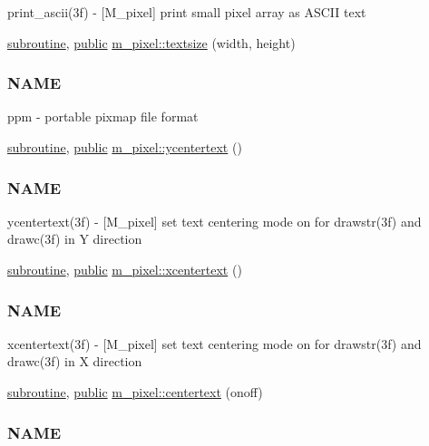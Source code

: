 \begin{DoxyCompactItemize}
\begin{DoxyCompactList}
print\+\_\+ascii(3f) -\/ \mbox{[}M\+\_\+pixel\mbox{]} print small pixel array as A\+S\+C\+II text \end{DoxyCompactList}\item 
\hyperlink{M__stopwatch_83_8txt_acfbcff50169d691ff02d4a123ed70482}{subroutine}, \hyperlink{M__stopwatch_83_8txt_a2f74811300c361e53b430611a7d1769f}{public} \hyperlink{namespacem__pixel_a070e9fff1f2cd0c89d40c5d3c72b7f2c}{m\+\_\+pixel\+::textsize} (width, height)
\begin{DoxyCompactList}\small\item\em \subsubsection*{N\+A\+ME}

ppm -\/ portable pixmap file format \end{DoxyCompactList}\item 
\hyperlink{M__stopwatch_83_8txt_acfbcff50169d691ff02d4a123ed70482}{subroutine}, \hyperlink{M__stopwatch_83_8txt_a2f74811300c361e53b430611a7d1769f}{public} \hyperlink{namespacem__pixel_a2e32105b5e77abf38768fec6b11376a3}{m\+\_\+pixel\+::ycentertext} ()
\begin{DoxyCompactList}\small\item\em \subsubsection*{N\+A\+ME}

ycentertext(3f) -\/ \mbox{[}M\+\_\+pixel\mbox{]} set text centering mode on for drawstr(3f) and drawc(3f) in Y direction \end{DoxyCompactList}\item 
\hyperlink{M__stopwatch_83_8txt_acfbcff50169d691ff02d4a123ed70482}{subroutine}, \hyperlink{M__stopwatch_83_8txt_a2f74811300c361e53b430611a7d1769f}{public} \hyperlink{namespacem__pixel_a1e0c43d36b35eafea921f91c31d8a478}{m\+\_\+pixel\+::xcentertext} ()
\begin{DoxyCompactList}\small\item\em \subsubsection*{N\+A\+ME}

xcentertext(3f) -\/ \mbox{[}M\+\_\+pixel\mbox{]} set text centering mode on for drawstr(3f) and drawc(3f) in X direction \end{DoxyCompactList}\item 
\hyperlink{M__stopwatch_83_8txt_acfbcff50169d691ff02d4a123ed70482}{subroutine}, \hyperlink{M__stopwatch_83_8txt_a2f74811300c361e53b430611a7d1769f}{public} \hyperlink{namespacem__pixel_a9ddc8e8604bbc3181c728f08a6b87904}{m\+\_\+pixel\+::centertext} (onoff)
\begin{DoxyCompactList}\small\item\em \subsubsection*{N\+A\+ME}


\end{DoxyCompactList}
\end{DoxyCompactItemize}

